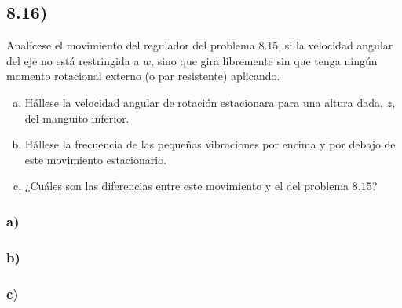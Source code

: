 \documentclass{article}
\begin{document}
\subsection*{8.16)}
Analícese el movimiento del regulador del problema $8.15$, si la velocidad angular 
del eje no está restringida a $w$, sino que gira libremente sin que tenga ningún momento 
rotacional externo (o par resistente) aplicando. 
\begin{enumerate}[a)]
    \item Hállese la velocidad angular de rotación estacionara para una altura dada, $z$, 
    del manguito inferior.
    \item Hállese la frecuencia de las pequeñas vibraciones por encima y por debajo de este movimiento 
    estacionario. 
    \item ¿Cuáles son las diferencias entre este movimiento y el del problema $8.15$?
\end{enumerate}
\begin{tcolorbox}[breakable]
    \subsubsection*{a)}
    \subsubsection*{b)}
    \subsubsection*{c)}
\end{tcolorbox}
\end{document}
